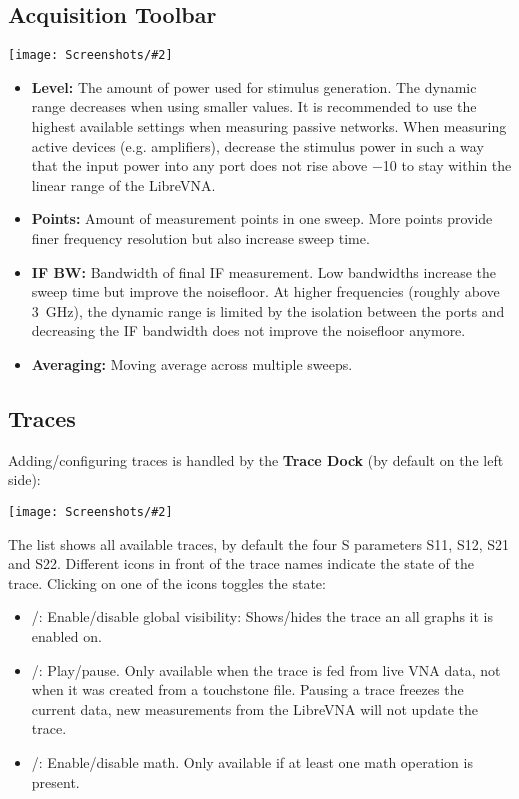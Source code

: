 \documentclass[a4paper,11pt]{article}
\newcommand{\vna}{LibreVNA}
\newcommand{\screenshot}[2]{\begin{center}
\texttt{[image: Screenshots/\#2]}
\end{center}}
\begin{document}
\subsection{Acquisition Toolbar}
\screenshot{0.7}{ToolbarVNAAcquisition.png}
\begin{itemize}
\item \textbf{Level:} The amount of power used for stimulus generation. The dynamic range decreases when using smaller values. It is recommended to use the highest available settings when measuring passive networks. When measuring active devices (e.g. amplifiers), decrease the stimulus power in such a way that the input power into any port does not rise above \SI{-10}{\dBm} to stay within the linear range of the \vna.
\item \textbf{Points:} Amount of measurement points in one sweep. More points provide finer frequency resolution but also increase sweep time.
\item \textbf{IF BW:} Bandwidth of final IF measurement. Low bandwidths increase the sweep time but improve the noisefloor. At higher frequencies (roughly above \SI{3}{\giga\hertz}), the dynamic range is limited by the isolation between the ports and decreasing the IF bandwidth does not improve the noisefloor anymore.
\item \textbf{Averaging:} Moving average across multiple sweeps.
\end{itemize}

\subsection{Traces}
Adding/configuring traces is handled by the \textbf{Trace Dock} (by default on the left side): 
\screenshot{0.3}{TraceDock.png}
The list shows all available traces, by default the four S parameters S11, S12, S21 and S22. Different icons in front of the trace names indicate the state of the trace. Clicking on one of the icons toggles the state:
\begin{itemize}
\item /: Enable/disable global visibility: Shows/hides the trace an all graphs it is enabled on.
\item /: Play/pause. Only available when the trace is fed from live VNA data, not when it was created from a touchstone file. Pausing a trace freezes the current data, new measurements from the \vna{} will not update the trace.
\item /: Enable/disable math. Only available if at least one math operation is present.
\end{itemize}
\end{document}
